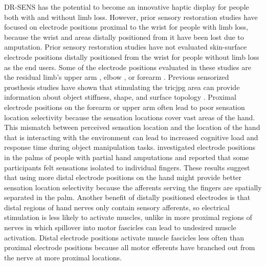 \documentclass[10pt]{iopart}
\begin{document}
DR-SENS has the potential to become an innovative haptic display for people both with and without limb loss. However, prior sensory restoration studies have focused on electrode positions proximal to the wrist for people with limb loss, because the wrist and areas distally positioned from it have been lost due to amputation. Prior sensory restoration studies have not evaluated skin-surface electrode positions distally positioned from the wrist for  people without limb loss as the end users. Some of the electrode positions evaluated in these studies are the residual limb's upper arm \cite{vargas_evoked_2019, henry_shin_evoked_2018}, elbow \cite{forst_surface_2015, slopsema_natural_2018}, or forearm \cite{pena_channel-hopping_2021,danna_somatotopic_2017}. Previous sensorized prosthesis studies have shown that stimulating the tricjpg area can provide information about object stiffness, shape, and surface topology \cite{vargas_object_2020, vargas_evoked_2019}. Proximal electrode positions on the forearm or upper arm often lead to poor sensation location selectivity because the sensation locations cover vast areas of the hand. This mismatch between perceived sensation location and the location of the hand that is interacting with the environment can lead to increased cognitive load and response time during object manipulation tasks\cite{pena_channel-hopping_2021}. \citet{dalonzo_electro-cutaneous_2018} investigated electrode positions in the palms of people with partial hand amputations and reported that some participants felt sensations isolated to individual fingers. These results suggest that using more distal electrode positions on the hand might provide better sensation location selectivity because the afferents serving the fingers are spatially separated in the palm. Another benefit of distally positioned electrodes is that distal regions of hand nerves only contain sensory afferents, so electrical stimulation is less likely to activate muscles, unlike in more proximal regions of nerves in which spillover into motor fascicles can lead to undesired muscle activation. Distal electrode positions activate muscle fascicles less often than proximal electrode positions because all motor efferents have branched out from the nerve at more proximal locations.
\end{document}
